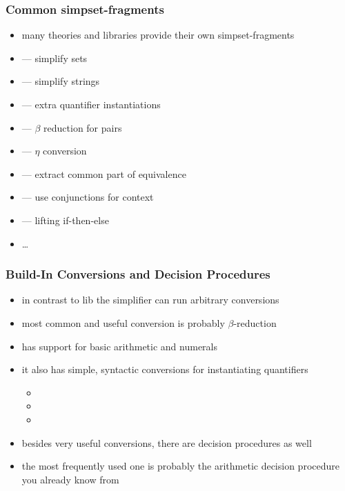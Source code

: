 \begin{frame}[fragile]
\frametitle{Common simpset-fragments}

\begin{itemize}
\item many theories and libraries provide their own simpset-fragments
\item {} --- simplify sets
\item {} --- simplify strings
\item {} --- extra quantifier instantiations
\item {} --- $\beta$ reduction for pairs
\item {} --- $\eta$ conversion
\item {} --- extract common part of equivalence
\item {} --- use conjunctions for context
\item {} --- lifting if-then-else
\item \ldots
\end{itemize}
\end{frame}


\begin{frame}
\frametitle{Build-In Conversions and Decision Procedures}

\begin{itemize}
\item in contrast to  lib the simplifier can
run arbitrary conversions
\item most common and useful conversion is probably $\beta$-reduction
\item {} has support for basic arithmetic and numerals
\item it also has simple, syntactic conversions for instantiating quantifiers
\begin{itemize}
\item {}
\item {}
\item {}
\end{itemize}

\item besides very useful conversions, there are decision procedures as well
\item the most frequently used one is probably the arithmetic decision procedure you already know from 

\end{itemize}


\end{frame}


